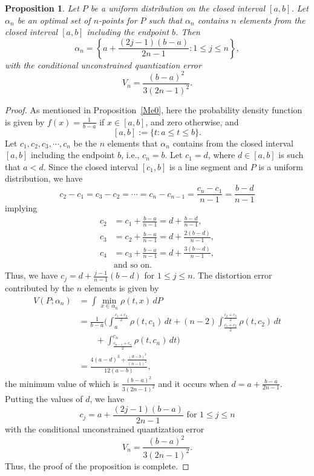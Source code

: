\documentclass[12pt, reqno]{amsart}
\theoremstyle{plain}
\newtheorem{prop}[subsection]{Proposition}
\theoremstyle{definition}
\newcommand{\set}[1]{\{#1\}}%
\newcommand{\ga}{\alpha}
\newcommand{\te}{\text}%
\begin{document}
   \begin{prop} \label{Me050} 
Let $P$ be a uniform distribution on the closed interval $[a, b]$. Let $\ga_n$ be an optimal set of $n$-points for $P$ such that $\ga_n$ contains $n$ elements from the closed interval $[a, b]$ including the endpoint $b$. Then
\[\ga_n=\left\{a+\frac{(2j-1)(b-a)}{2n-1} : 1\leq j\leq n\right\},\] 
with the conditional unconstrained quantization error 
 \[V_n=\frac{(b-a)^2}{3 (2 n-1)^2}.\]
\end{prop} 
 \begin{proof}
As mentioned in Proposition~\ref{Me0}, here the probability density function is given by $f(x)=\frac {1}{b-a}$ if $x\in [a, b]$, and zero otherwise, and 
\[[a, b]:=\set{t : a\leq t\leq b}.\]
Let ${c_1, c_2, c_3, \cdots, c_n}$ be the $n$ elements that $\ga_n$ contains from the closed interval $[a, b]$ including the endpoint $b$, i.e., $c_n=b$.  Let $c_1=d$, where $d\in [a, b]$ is such that $a<d$. 
Since the closed interval $[c_1, b]$ is a line segment and $P$ is a uniform distribution, we have 
\[c_2-c_1=c_3-c_2=\cdots=c_{n}-c_{n-1}=\frac{c_n-c_1}{n-1}=\frac {b-d}{n-1}\]
implying 
\begin{align*}
c_2&=c_1+\frac {b-a}{n-1}=d+\frac {b-d}{n-1},\\
c_3&=c_2+\frac {b-a}{n-1}=d+\frac {2(b-d)}{n-1}, \\
c_4&=c_3+\frac {b-a}{n-1}=d+\frac {3(b-d)}{n-1},\\
&\te{and so on.}
\end{align*} 
Thus, we have $c_j= d+\frac{j-1}{n-1}(b-d)$ for $ 1\leq j\leq n$. The distortion error contributed by the $n$ elements is given by
 \begin{align*}
V(P; \ga_n)&=\int\min_{x\in \ga_n} \rho(t, x)\, dP\\
&=\frac 1{b-a} \Big( \int_{a}^{\frac  {c_1+c_2}2} \rho(t, c_1)\,dt+(n-2) \int_{\frac  {c_1+c_2}2}^{\frac  {c_2+c_3}2} \rho(t, c_2)\,dt \\
&\qquad +\int_{\frac  {c_{n-1}+c_n}2}^{c_n} \rho(t, c_n)\,dt\Big)\\
&=\frac{4 (a-d)^3+\frac{(d-b)^3}{(n-1)^2}}{12 (a-b)},
\end{align*} 
the minimum value of which is $\frac{(b-a)^2}{3 (2 n-1)^2}$ and it occurs when $d=a+\frac{b-a}{2 n-1}$. Putting the values of $d$, we have
\[c_j=a+\frac{(2j-1)(b-a)}{2n-1} \te{ for } 1\leq j\leq n\] 
with the conditional unconstrained quantization error 
 \[V_n=\frac{(b-a)^2}{3 (2 n-1)^2}.\]
Thus, the proof of the proposition is complete. 
  \end{proof}
  
\end{document}
